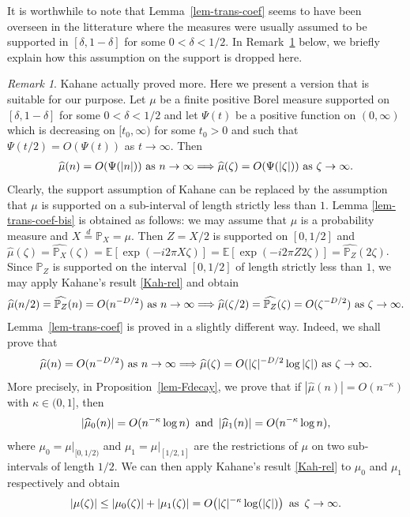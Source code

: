 \documentclass[12pt]{amsart}
\theoremstyle{definition}
\theoremstyle{remark}
\newtheorem{remark}{Remark}[section]
\newcommand{\E}{\mathbb{E}}
\newcommand{\PP}{\mathbb{P}}
\newcommand{\an}{\text{\, and \,}}
\newcommand{\as}{\text{\, as \,}}
\numberwithin{equation}{section}
\begin{document}
 It is worthwhile to note that Lemma~\ref{lem-trans-coef}  seems to  have been overseen in the litterature where the measures were usually assumed to be supported in $[\delta, 1- \delta]$ for some $0< \delta<1/2$.   In Remark~\ref{rem-ka} below, we briefly explain how this assumption on the support is dropped here. 
 \begin{remark}\label{rem-ka}
  Kahane \cite[Chapter 17, Lemma 1]{Kahane-book} actually proved  more. Here we present a version that is suitable for our purpose. Let $\mu$ be a finite positive Borel measure supported on $[\delta, 1 - \delta]$ for some $0< \delta<1/2$ and let  $\Psi(t)$ be  a positive function on $(0, \infty)$ which is decreasing on $[t_0, \infty)$ for some $t_0>0$ and  such that $\Psi (t/2)=O(\Psi(t))$ as $t\to\infty$. Then 
 \begin{align}\label{Kah-rel}
  \widehat{\mu}(n)=O(\Psi(|n|))  \text{\,\,as\,\,} n \rightarrow \infty  \Longrightarrow \widehat{\mu}(\zeta)=O(\Psi(|\zeta|))   \text{\,\,as\,\,} \zeta \rightarrow \infty. 
  \end{align}
 Clearly, the support assumption of Kahane can be replaced by the assumption that $\mu$ is supported on a sub-interval of length strictly less than $1$.  Lemma \ref{lem-trans-coef-bis}  is obtained as follows: we may assume that $\mu$ is a probability measure and $X \stackrel{d}{=}\PP_X = \mu$.  Then  $Z = X/2$ is supported on $[0, 1/2]$  and $\widehat{\mu}(\zeta)  = \widehat{\PP_X}(\zeta)= \E[\exp(-i 2 \pi X \zeta) ]= \E[\exp(-i 2 \pi Z 2 \zeta) ] = \widehat{\PP_Z}(2\zeta)$.  Since $\PP_Z$ is supported on the interval $[0,1/2]$ of length strictly less than $1$, we may apply Kahane's result \eqref{Kah-rel} and obtain 
 \[
 \widehat{\mu}(n/2) = \widehat{\PP_Z}(n) = O(n^{-D/2})  \text{\,\,as\,\,} n \rightarrow \infty   \Longrightarrow  \widehat{\mu}(\zeta/2) = \widehat{\PP_Z}(\zeta) = O(\zeta^{-D/2})  \text{\,\,as\,\,} \zeta \rightarrow \infty. 
 \]
Lemma~\ref{lem-trans-coef} is  proved in a slightly different way.  Indeed, we shall prove that 
\[
 \widehat{\mu}(n) = O(n^{-D/2})  \text{\,\,as\,\,} n \rightarrow \infty   \Longrightarrow  \widehat{\mu}(\zeta) = O(|\zeta|^{-D/2} \log |\zeta|)  \text{\,\,as\,\,} \zeta \rightarrow \infty. 
\]
More precisely,   in  Proposition~\ref{lem-Fdecay},  we prove that  if $|\widehat{\mu}(n)|  = O(n^{-\kappa})$ with $\kappa \in (0, 1]$, then 
\[
|\widehat{\mu}_0(n)|  = O(n^{-\kappa} \log n) \an  |\widehat{\mu}_1(n)| = O(n^{-\kappa} \log n),
\]
where $\mu_0 = \mu|_{[0,1/2)}$ and $\mu_1= \mu|_{[1/2, 1]}$ are the restrictions of $\mu$ on two sub-intervals of length $1/2$. We can then apply Kahane's result  \eqref{Kah-rel}  to $\mu_0$ and $\mu_1$ respectively and obtain 
\[
|\mu(\zeta)| \le    |\mu_0(\zeta)|  + |\mu_1(\zeta)|   = O  \big( |\zeta|^{-\kappa} \log (|\zeta|)\big) \as \zeta \to \infty.
\]
\end{remark}
\end{document}
